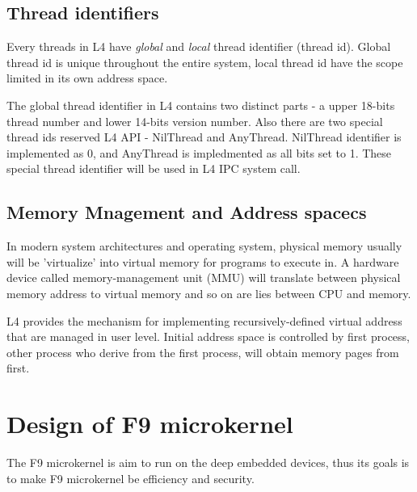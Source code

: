 \documentclass[10pt,preprint,nocopyrightspace]{sigplanconf}
\begin{document}
\subsection{Thread identifiers}

Every threads in L4 have \textit{global} and \textit{local} thread identifier (thread id). Global thread id is unique throughout the entire system, local thread id have the scope limited in its own address space.

The global thread identifier in L4 contains two distinct parts - a upper 18-bits thread number and lower 14-bits version number. Also there are two special thread ids reserved L4 API - NilThread and AnyThread. NilThread identifier is implemented as 0, and AnyThread is impledmented as all bits set to 1. These special thread identifier will be used in L4 IPC system call\cite{nourai2005aphysically}.

\subsection{Memory Mnagement and Address spacecs }

In modern system architectures and operating system, physical memory usually will be 'virtualize' into virtual memory for programs to execute in\cite{arpaci2015operating}. A hardware device called memory-management unit (MMU) will translate between physical memory address to virtual memory and so on are lies between CPU and memory.

L4 provides the mechanism for implementing recursively-defined virtual address that are managed in user level\cite{dannowski2011l4}. Initial address space is controlled by first process, other process who derive from the first process, will obtain memory pages from first.

\section{Design of F9 microkernel}

The F9 microkernel is aim to run on the deep embedded devices, thus its goals is to make F9 microkernel be efficiency and security.
\end{document}
